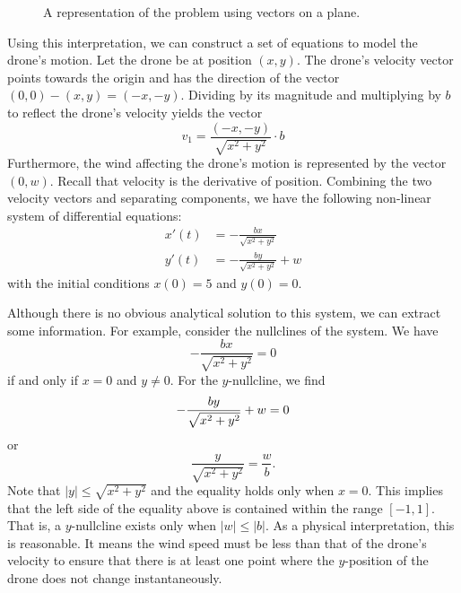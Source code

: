 \documentclass{article}
\begin{document}
    \begin{figure}[H]
        \centering
        \caption{\label{fig:graph} A representation of the problem using vectors
        on a plane.}
    \end{figure}

    Using this interpretation, we can construct a set of equations to model the
    drone's motion. Let the drone be at position $(x, y)$. The drone's velocity
    vector points towards the origin and has the direction of the vector $(0, 0)
    - (x, y) = (-x, -y)$. Dividing by its magnitude and multiplying by
    $b$ to reflect the drone's velocity yields the vector
    \[
        v_1 = \frac{(-x, -y)}{\sqrt{x^2 + y^2}} \cdot b
    \] 
    Furthermore, the wind affecting the drone's motion is represented by the
    vector $(0, w)$. Recall that velocity is the derivative of position.
    Combining the two velocity vectors and separating components, we have the
    following non-linear system of differential equations:
    \begin{align}
        x'(t) &= -\frac{bx}{\sqrt{x^2+y^2}} \\
        y'(t) &= -\frac{by}{\sqrt{x^2+y^2}} + w
    \end{align}
    with the initial conditions $x(0) = 5$ and $y(0) = 0$.

    Although there is no obvious analytical solution to this system, we can
    extract some information. For example, consider the nullclines of the
    system. We have
    \[
        -\frac{bx}{\sqrt{x^2+y^2}} = 0
    \] 
    if and only if $x = 0$ and $y \neq 0$. For the  $y$-nullcline, we find
    \[
        -\frac{by}{\sqrt{x^2+y^2}} + w = 0 \\
    \] 
    or
    \[
        \frac{y}{\sqrt{x^2+y^2}} = \frac{w}{b}.
    \] 
    Note that $|y| \leq \sqrt{x^2 + y^2}$ and the equality holds only when $x =
    0$. This implies that the left side of the equality above is contained
    within the range $[-1, 1]$. That is, a $y$-nullcline exists only when $|w|
    \leq |b|$. As a physical interpretation, this is reasonable. It means the
    wind speed must be less than that of the drone's velocity to ensure that
    there is at least one point where the $y$-position of the drone does not
    change instantaneously.
\end{document}
